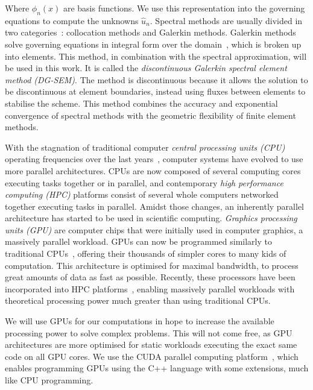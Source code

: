 Where $\phi _n(x)$ are basis functions. We use this representation into the governing equations to
compute the unknowns $\widehat{u}_n$. Spectral methods are usually divided in two
categories~\cite{Karniadakis2005}: collocation methods and Galerkin methods. Galerkin methods solve
governing equations in integral form over the domain~\cite{Reed1973}, which is broken up into
elements. This method, in combination with the spectral approximation, will be used in this work. It
is called the \textit{discontinuous Galerkin spectral element method (DG-SEM)}. The method is
discontinuous because it allows the solution to be discontinuous at element boundaries, instead
using fluxes between elements to stabilise the scheme. This method combines the accuracy and
exponential convergence of spectral methods with the geometric flexibility of finite element
methods. 

With the stagnation of traditional computer \textit{central processing units (CPU)} operating
frequencies over the last years~\cite{Parkhurst2006}, computer systems have evolved to use more
parallel architectures. CPUs are now composed of several computing cores~\cite{Nayfeh1997} executing
tasks together or in parallel, and contemporary \textit{high performance computing (HPC)} platforms
consist of several whole computers networked together executing tasks in parallel. Amidst those
changes, an inherently parallel architecture has started to be used in scientific computing.
\textit{Graphics processing units (GPU)} are computer chips that were initially used in computer
graphics, a massively parallel workload. GPUs can now be programmed similarly to traditional
CPUs~\cite{Owens2008}, offering their thousands of simpler cores to many kids of computation. This
architecture is optimised for maximal bandwidth, to process great amounts of data as fast as
possible. Recently, these processors have been incorporated into HPC platforms~\cite{Fan2004},
enabling massively parallel workloads with theoretical processing power much greater than using
traditional CPUs.

We will use GPUs for our computations in hope to increase the available processing power to solve
complex problems. This will not come free, as GPU architectures are more optimised for static
workloads executing the exact same code on all GPU cores. We use the CUDA parallel computing
platform~\cite{Garland2008}, which enables programming GPUs using the C++ language with some
extensions, much like CPU programming.

